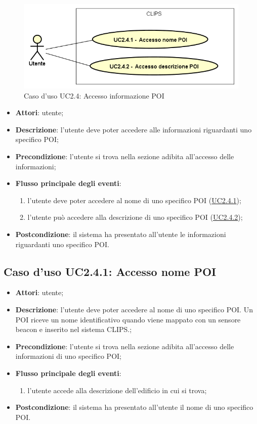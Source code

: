 \documentclass[../AnalisiDeiRequisiti.tex]{subfiles}
\begin{document}
\begin{figure}[H]
	\centering
	\includegraphics[scale=0.95, width=\textwidth]{img/UC2-4.png}
	\caption{Caso d'uso UC2.4: Accesso informazione POI}\label{fig:UC2.4} 
\end{figure}
\begin{itemize}
	\item \textbf{Attori}: utente;
	\item \textbf{Descrizione}: l'utente deve poter accedere alle informazioni riguardanti uno specifico POI; 
	\item \textbf{Precondizione}: l'utente si trova nella sezione adibita all'accesso delle informazioni;
	
	\item \textbf{Flusso principale degli eventi}:
	\begin{enumerate}
		\item l'utente deve poter accedere al nome di uno specifico POI (\hyperlink{UC2.4.1}{UC2.4.1});
		\item l'utente può accedere alla descrizione di uno specifico POI (\hyperlink{UC2.4.2}{UC2.4.2});
		
	\end{enumerate}
	\item \textbf{Postcondizione}: il sistema ha presentato all'utente le informazioni riguardanti uno specifico POI.
\end{itemize}
\hypertarget{UC2.4.1}{}
\subsection{Caso d'uso UC2.4.1: Accesso nome POI}
\begin{itemize}
	\item \textbf{Attori}: utente;
	\item \textbf{Descrizione}: l'utente deve poter accedere al nome di uno specifico POI. Un POI riceve un nome identificativo quando viene mappato con un sensore beacon e inserito nel sistema CLIPS.; 
	\item \textbf{Precondizione}: l'utente si trova nella sezione adibita all'accesso delle informazioni di uno specifico POI;
	
	\item \textbf{Flusso principale degli eventi}:
	\begin{enumerate}
		\item l'utente accede alla descrizione dell'edificio in cui si trova;
		
	\end{enumerate}
	\item \textbf{Postcondizione}: il sistema ha presentato all'utente il nome di uno specifico POI.
\end{itemize}
\hypertarget{UC2.4.2}{}
\end{document}
